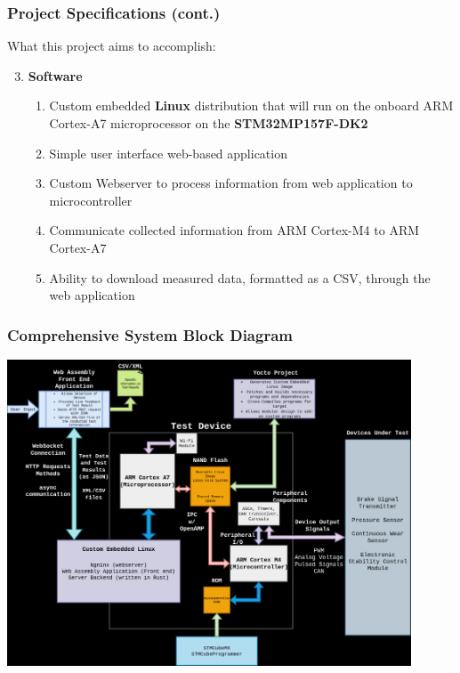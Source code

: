 \documentclass[8pt,compress]{beamer}
\newcommand\LightBold[1]{\textcolor{VSBlueLight}{\textbf{#1}}}
\newcommand\DarkBold[1]{\textcolor{VSBlueDark}{\textbf{#1}}}
\begin{document}
\begin{frame}
  \frametitle{Project Specifications (cont.)}
  \begin{block}{What this project aims to accomplish:}
    \begin{enumerate}
        \setcounter{enumi}{2}
        \large
      \item \DarkBold{Software}
        \begin{enumerate}
            \large
          \item Custom embedded \textbf{Linux} distribution that will run on the onboard ARM Cortex-A7
            microprocessor on the \LightBold{STM32MP157F-DK2}
          \item Simple user interface web-based application
          \item Custom Webserver to process information from web application to microcontroller
          \item Communicate collected information from ARM Cortex-M4 to ARM Cortex-A7
          \item Ability to download measured data, formatted as a CSV, through the web application 
        \end{enumerate}
    \end{enumerate}
  \end{block}
\end{frame}

\begin{frame}
  \frametitle{Comprehensive System Block Diagram}
  \includegraphics[width=0.90\textwidth]{assets/diagrams/block_diagram.drawio.png}
\end{frame}
\end{document}

